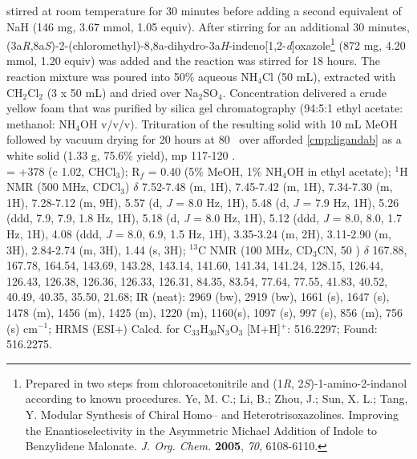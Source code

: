 stirred at room temperature for 30 minutes before adding a second equivalent of NaH (146 mg, 3.67
mmol, 1.05 equiv). After stirring for an additional 30 minutes,
(3a\textit{R},8a\textit{S})-2-(chloromethyl)-8,8a-dihydro-3a\textit{H}-indeno[1,2-\textit{d}]oxazole\footnote{Prepared
in two steps from chloroacetonitrile and (1\textit{R}, 2\textit{S})-1-amino-2-indanol according to
known procedures. {\frenchspacing Ye, M. C.; Li, B.; Zhou, J.; Sun, X. L.; Tang, Y. Modular
Synthesis of Chiral Homo-- and Heterotrisoxazolines. Improving the Enantioselectivity in the
Asymmetric Michael Addition of Indole to Benzylidene Malonate. \textit{J. Org. Chem.} \textbf{2005}, \textit{70}, 6108-6110.}}  (872 mg, 4.20 mmol, 1.20 equiv) was added and the reaction was stirred for 18 hours.  The reaction mixture was poured into 50\% aqueous NH$_4$Cl (50 mL), extracted with CH$_2$Cl$_2$ (3 x 50 mL) and dried over Na$_2$SO$_4$.
Concentration delivered a crude yellow foam that was purified by silica gel chromatography
(94:5:1 ethyl acetate: methanol: NH$_4$OH v/v/v). Trituration of the
resulting solid with 10 mL MeOH followed by vacuum drying for 20 hours at 80 \degc\ over 
afforded \ref{cmp:ligandab} as a white solid (1.33 g, 75.6\% yield), mp 117-120 \degc.\\
\rotation =  +378 (c 1.02, CHCl$_3$); R$_f$ = 0.40 (5\% MeOH, 1\% NH$_4$OH in ethyl acetate); $^1$H
NMR (500 MHz, CDCl$_3$) $\delta$ 7.52-7.48 (m, 1H), 7.45-7.42 (m, 1H), 7.34-7.30 (m, 1H), 7.28-7.12 (m, 9H), 5.57 (d, \textit{J} = 8.0 Hz, 1H), 5.48 (d, \textit{J} = 7.9 Hz, 1H),
5.26 (ddd, 7.9, 7.9, 1.8 Hz, 1H), 5.18 (d, \textit{J} = 8.0 Hz, 1H), 5.12 (ddd, \textit{J} = 8.0,
8.0, 1.7 Hz, 1H), 4.08 (ddd, \textit{J} = 8.0, 6.9, 1.5 Hz, 1H), 3.35-3.24 (m, 2H), 3.11-2.90 (m,
3H), 2.84-2.74 (m, 3H), 1.44 (s, 3H); $^{13}$C NMR (100 MHz, CD$_3$CN, 50 \degc) $\delta$ 167.88,
167.78, 164.54, 143.69, 143.28, 143.14, 141.60, 141.34, 141.24, 128.15, 126.44, 126.43, 126.38, 126.36, 126.33, 126.31,
 84.35, 83.54, 77.64, 77.55, 41.83, 40.52, 40.49, 40.35, 35.50, 21.68; IR (neat): 2969 (bw), 2919
 (bw), 1661 (s), 1647 (s), 1478 (m), 1456 (m), 1425 (m), 1220 (m), 1160(s), 1097 (s), 997 (s), 856
 (m), 756 (s) cm$^{-1}$; HRMS (ESI+) Calcd. for C$_{33}$H$_{30}$N$_3$O$_3$ [M+H]$^{+}$: 516.2297; Found: 516.2275.


